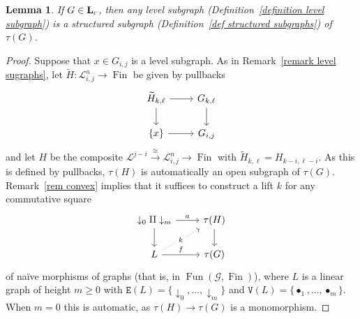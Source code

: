 \documentclass{amsart}
\numberwithin{theorem}{subsection}
\newtheorem{lemma}[theorem]{Lemma}
\theoremstyle{definition}
\newcommand{\xFun}{\operatorname{Fun}}
\newcommand{\finset}{\operatorname{Fin}}
\newcommand{\name}[1]{\ensuremath{\text{\textup{#1}}}}
\newcommand{\levelg}{\mathbf{L}}
\newcommand{\levelgconn}{\levelg_{\name{c}}}
\newcommand{\edge}{\mathtt{E}}
\newcommand{\vertex}{\mathtt{V}}
\newcommand{\scriptyell}{\mathscr L}
\begin{document}
\begin{lemma}\label{lemma: level subgraph}
If $G\in \levelgconn$, then any level subgraph (Definition~\ref{definition level subgraph}) is a structured subgraph (Definition~\ref{def structured subgraphs}) of $\tau(G)$.
\end{lemma}
\begin{proof}
Suppose that $x\in G_{i,j}$ is a level subgraph.
As in Remark~\ref{remark level sugraphs}, let $\widetilde H\colon\scriptyell^n_{i,j} \to \finset$ be given by pullbacks
\begin{equation}\label{pullback square for lemma level sub}
\begin{tikzcd}
\widetilde H_{k,\ell} \rar \dar &  G_{k,\ell} \dar \\
\{x\} \rar &  G_{i,j}
\end{tikzcd}
\end{equation}
and let $H$ be the composite $\scriptyell^{j-i} \overset\cong\to \scriptyell^n_{i,j} \to \finset$ with $\widetilde H_{k,\ell} = H_{k-i,\ell-i}$.
As this is defined by pullbacks, $\tau(H)$ is automatically an open subgraph of $\tau(G)$.
Remark~\ref{rem convex} implies that it suffices to construct a lift $k$ for any commutative square
\[
\begin{tikzcd}
\downarrow_0 \amalg \downarrow_m \rar{a} \dar & \tau(H) \dar \\
L \rar{f} \arrow[ur, dotted, "k" description] & \tau(G)
\end{tikzcd}
\]
of na\"ive morphisms of graphs (that is, in $\xFun(\mathscr{G}, \finset)$), where $L$ is a linear graph of height $m\geq 0$ with $\edge(L) = \{ \downarrow_0, \dots, \downarrow_m \}$ and $\vertex(L) = \{ \bullet_1, \dots, \bullet_m \}$.
When $m=0$ this is automatic, as $\tau(H) \to \tau(G)$ is a monomorphism.


\end{proof}
\end{document}
